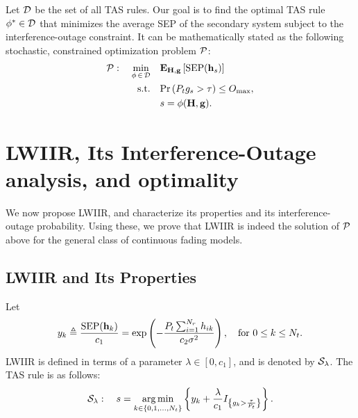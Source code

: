 \documentclass[12pt,draftcls,peerreview,onecolumn]{IEEEtran}
\newcommand{\brac}[1]{\left({#1}\right)}
\newcommand{\cbrac}[1]{\left\{{#1}\right\}}
\newcommand{\indic}[1]{I_{\cbrac{#1}}}
\newcommand{\define}{\triangleq}
\newcommand{\tendsto}{\to}
\newcommand{\mtx}[1]{{\bf #1}} %
\newcommand{\explow}[2]{{\bf{E}}_{#1}\left[{#2}\right]}
\newcommand{\prob}[1]{\text{Pr}\brac{#1}}
\DeclareMathOperator*{\argmin}{arg\,min}
\newcommand{\SEP}{\text{SEP}}
\newcommand{\nx}{{0}}
\newcommand{\lam}{\lambda}
\newcommand{\Nt}{{N_t}}
\newcommand{\Nr}{{N_r}}
\newcommand{\Pt}{{P_t}}
\newcommand{\such}{h}
\newcommand{\puch}{g}
\newcommand{\hk}[1]{{\such_{#1}}}
\newcommand{\gk}[1]{{\puch_{#1}}}
\newcommand{\g}{\mathbf{\puch}}
\newcommand{\noisevar}{\sigma^2}
\newcommand{\outmax}{O_{\text{max}}}
\newcommand{\itau}{\tau}
\newcommand{\cone}{c_{1}}
\newcommand{\ctwo}{c_{2}}
\newcommand{\taubypt}{\frac{\itau}{\Pt}}
\newcommand{\gkgrtaubypt}[1]{{\gk{#1}}>\taubypt}
\newcommand{\gindic}[1]{\indic{\gkgrtaubypt{#1}}}
\newcommand{\lambym}{\frac{\lam}{\cone}}
\newcommand{\yk}[1]{y_{#1}}
\newcommand{\ykplusgk}[1]{ \yk{#1} + \lambym\gindic{#1}}
\newcommand{\allopts}{\left\{\nx,1,\ldots,\Nt\right\}}
\newcommand{\asrule}{\phi}
\newcommand{\asspan}{{\cal D}}
\newcommand{\Hmx}{\mtx{H}}
\newcommand{\optproblem}{{\cal P}}
\newcommand{\callamrule}{{\cal S_{{\lam}}}}
\begin{document}
Let $\asspan$ be the set of all TAS rules. Our goal is to find the optimal TAS rule $\phi^{*}\in\asspan$ that minimizes the average SEP of the secondary system subject to the interference-outage constraint. It can be mathematically stated as the  following stochastic, constrained optimization problem $\optproblem$:
\begin{align}
\label{eq:objective}
\optproblem: \quad \min_{\asrule\,\in\,\asspan} \quad
&\explow{\Hmx,\g}{\SEP(\hs)} \\
\label{eq:cons}
\text{s.t.} \quad &\prob{\Pt\gk{s}>\itau} \leq \outmax, \\
 &s = \phi(\Hmx,\g). 
\end{align}



\section{LWIIR, Its Interference-Outage analysis, and optimality}
\label{sec:analysis}
%
We now propose LWIIR, and characterize its properties and its interference-outage probability. Using these, we prove that LWIIR is indeed the solution of  $\optproblem$ above for the general class of continuous fading models. %


\subsection{LWIIR and Its Properties}
\label{sec:lambda_rule}
Let 
\begin{equation}
\yk{k} \define \frac{\SEP(\bhk{k})}{\cone} = \exp\left({- \frac{\Pt\sum_{i=1}^{\Nr}\hk{ik}}{\ctwo\noisevar} }\right), \quad \text{for}\,\,  0\leq k \leq\Nt.
\label{eq:yi_def}
\end{equation}
LWIIR is defined in terms of a parameter $\lam \in \left[0, \cone\right]$, and is denoted by $\callamrule$. The TAS rule is as follows:
\begin{equation}
\callamrule: \quad s=\argmin\limits_{k\in\allopts} \left\{ \ykplusgk{k} \right\}.
\label{eq:lam_weight_rule}
\end{equation}
\end{document}
